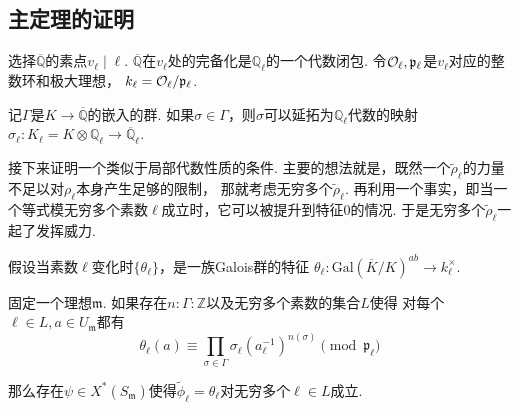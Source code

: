 \subsection{主定理的证明}

选择$\overline{\mathbb{Q}}$的素点$v_{\ell} \mid \ell$.
$\overline{\mathbb{Q}}$在$v_{\ell}$处的完备化是$\mathbb{Q}_{\ell}$的一个代数闭包.
令$\mathcal{O}_{\ell}, \mathfrak{p}_{\ell}$是$v_{\ell}$对应的整数环和极大理想，
$k_{\ell} = \mathcal{O}_{\ell} / \mathfrak{p}_{\ell}$.

记$\Gamma$是$K\to \overline{\mathbb{Q}}$的嵌入的群.
如果$\sigma\in \Gamma$，则$\sigma$可以延拓为$\mathbb{Q}_{\ell}$代数的映射
$\sigma_{\ell}: K_{\ell} = K\otimes \mathbb{Q}_{\ell}\to \overline{\mathbb{Q}}_{\ell}$.

接下来证明一个类似于局部代数性质的条件.
主要的想法就是，既然一个$\tilde{\rho}_{\ell}$的力量不足以对$\rho_{\ell}$本身产生足够的限制，
那就考虑无穷多个$\tilde{\rho}_{\ell}$.
再利用一个事实，即当一个等式模无穷多个素数$\ell$成立时，它可以被提升到特征$0$的情况.
于是无穷多个$\tilde{\rho}_{\ell}$一起了发挥威力.

假设当素数$\ell$变化时$\{\theta_{\ell}\}$，是一族Galois群的特征
$\theta_{\ell}: \mathrm{Gal}(\overline{K}/K)^{ab}\to k_{\ell}^{\times}$.

\begin{cprop}
    固定一个理想$\mathfrak{m}$.
    如果存在$n:\Gamma: \mathbb{Z}$以及无穷多个素数的集合$L$使得
    对每个$\ell\in L, a\in U_{\mathfrak{m}}$都有
    \begin{equation}
        \theta_{\ell}(a) \equiv \prod_{\sigma\in \Gamma} \sigma_{\ell}(a_{\ell}^{-1})^{n(\sigma)} \pmod{\mathfrak{p}_{\ell}}
    \end{equation}

    那么存在$\psi\in X^{*}(S_{\mathfrak{m}})$使得$\tilde{\phi}_{\ell} = \theta_{\ell}$对无穷多个$\ell\in L$成立.
\end{cprop}

